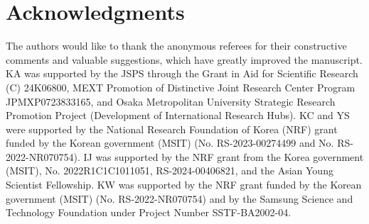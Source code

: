 \documentclass[11pt]{amsart}
\theoremstyle{definition}
\theoremstyle{definition}
\numberwithin{equation}{section}
\newcommand{\0}{\emptyset}
\begin{document}
			
			
			
			
			\section*{Acknowledgments}
			{The authors would like to thank the anonymous referees for their constructive comments and valuable suggestions, which have greatly improved the manuscript.}   KA was supported by the JSPS through the Grant in Aid for Scientific Research (C) 24K06800, MEXT Promotion of Distinctive Joint Research Center Program JPMXP0723833165, and Osaka Metropolitan University Strategic Research Promotion Project (Development of International Research Hubs).
            KC and YS were supported by the National Research Foundation of Korea (NRF) grant funded by the Korean government (MSIT) (No. RS-2023-00274499 and No. RS-2022-NR070754).
			IJ was supported by the NRF grant from the Korea government (MSIT), No. 2022R1C1C1011051, RS-2024-00406821, and the Asian Young Scientist Fellowship.
			KW was supported by the NRF grant funded by the Korean government (MSIT) (No. RS-2022-NR070754) and by the Samsung Science and Technology Foundation under Project Number SSTF-BA2002-04.
			
			
			
			
		
\end{document}
